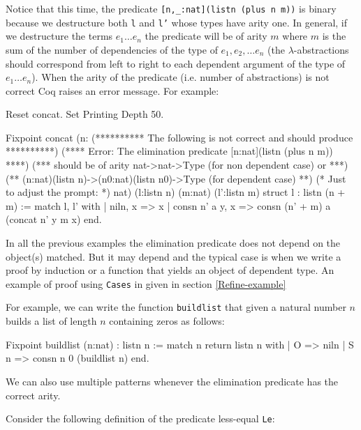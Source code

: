 Notice that this time, the predicate \texttt{[n,\_:nat](listn (plus n
  m))}  is binary because we
destructure both \texttt{l} and \texttt{l'} whose types have arity one.
In general, if we destructure the terms $e_1\ldots e_n$
the predicate will be of arity $m$ where $m$ is the sum of the
number of dependencies of the type of $e_1, e_2,\ldots e_n$ 
(the $\lambda$-abstractions
should correspond from left to right to each dependent argument of the
type of $e_1\ldots e_n$).
When the arity of the predicate (i.e. number of abstractions) is not
correct Coq raises an error message. For example:

\begin{coq_eval}
Reset concat.
Set Printing Depth 50.
\end{coq_eval}

\begin{coq_example}
Fixpoint concat
 (n:
  (********** The following is not correct and should produce **********)
  (**** Error: The elimination predicate [n:nat](listn (plus n m))  ****)
  (*** should be of arity nat->nat->Type (for non dependent case) or ***)
  (** (n:nat)(listn n)->(n0:nat)(listn n0)->Type (for dependent case) **)
  (* Just to adjust the prompt: *) nat) (l:listn n) (m:nat)
 (l':listn m) {struct l} : listn (n + m) :=
  match l, l' with
  | niln, x => x
  | consn n' a y, x => consn (n' + m) a (concat n' y m x)
  end.
\end{coq_example}

In all the previous examples the elimination predicate does not depend
on the object(s) matched. But it may depend and the typical case 
is when we write a proof by induction or a function that yields an
object of dependent type. An example of proof using \texttt{Cases} in
given in section \ref{Refine-example}

For example, we can write 
the function \texttt{buildlist} that given a natural number
$n$ builds a list of length $n$ containing zeros as follows:

\begin{coq_example}
Fixpoint buildlist (n:nat) : listn n :=
  match n return listn n with
  | O => niln
  | S n => consn n 0 (buildlist n)
  end.
\end{coq_example}

We can also use multiple patterns whenever the elimination predicate has
the correct arity. 

Consider the following definition of the predicate less-equal
\texttt{Le}:

